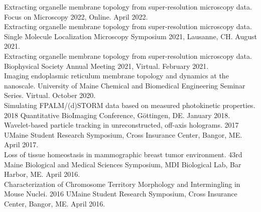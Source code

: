  {
    Extracting organelle membrane topology from super-resolution microscopy data. Focus on Microscopy 2022, Online. April 2022. \\

    Extracting organelle membrane topology from super-resolution microscopy data. Single Molecule Localization Microscopy Symposium 2021, Lausanne, CH. August 2021. \\

    Extracting organelle membrane topology from super-resolution microscopy data. Biophysical Society Annual Meeting 2021, Virtual. February 2021. \\

    Imaging endoplasmic reticulum membrane topology and dynamics at the nanoscale. University of Maine Chemical and Biomedical Engineering Seminar Series. Virtual. October 2020. \\
    
    Simulating FPALM/(d)STORM data based on measured photokinetic properties. 2018 Quantitative BioImaging Conference, Göttingen, DE. January 2018. \\

    Wavelet-based particle tracking in unreconstructed, off-axis holograms. 2017 UMaine Student Research Symposium, Cross Insurance Center, Bangor, ME. April 2017. \\

    Loss of tissue homeostasis in mammographic breast tumor environment. 43rd Maine Biological and Medical Sciences Symposium, MDI Biological Lab, Bar Harbor, ME. April 2016. \\

    Characterization of Chromosome Territory Morphology and Intermingling in Mouse Nuclei. 2016 UMaine Student Research Symposium, Cross Insurance Center, Bangor, ME. April 2016. \\
}

\vspace{11pt}

